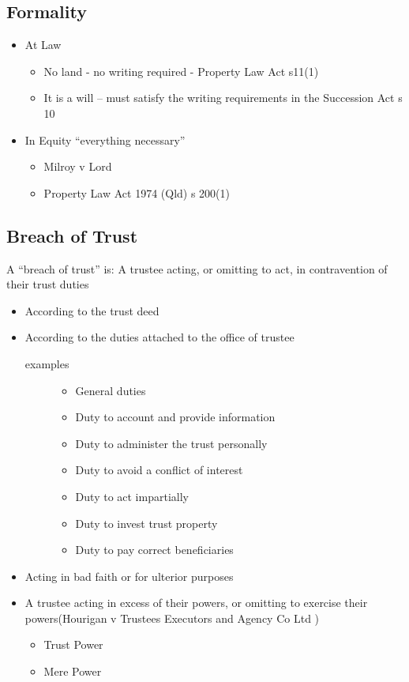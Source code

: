 \subsection*{Formality}
\begin{itemize}
    \item At Law
        \begin{itemize}
            \item  No land - no writing required - Property Law Act s11(1)
            \item It is a will – must satisfy the writing requirements in the
Succession Act s 10
        \end{itemize}
    \item In Equity “everything necessary”
        \begin{itemize}
            \item Milroy v Lord
            \item Property Law Act 1974 (Qld) s 200(1)
        \end{itemize}
\end{itemize}

\subsection*{Breach of Trust}
A “breach of trust” is: A trustee acting, or omitting to act, in contravention of their trust duties
\begin{itemize}
    \item According to the trust deed
    \item According to the duties attached to the office of trustee
        \begin{description}
            \item[examples]
                \begin{itemize}
                    \item General duties
                    \item Duty to account and provide information
                    \item Duty to administer the trust personally
                    \item Duty to avoid a conflict of interest
                    \item Duty to act impartially
                    \item Duty to invest trust property
                    \item Duty to pay correct beneficiaries
                \end{itemize}
        \end{description}
    \item Acting in bad faith or for ulterior purposes

    \item A trustee acting in excess of their powers, or omitting to exercise their powers(Hourigan v Trustees Executors and Agency Co Ltd )
        \begin{itemize}
            \item Trust Power
            \item Mere Power
        \end{itemize}
\end{itemize}

